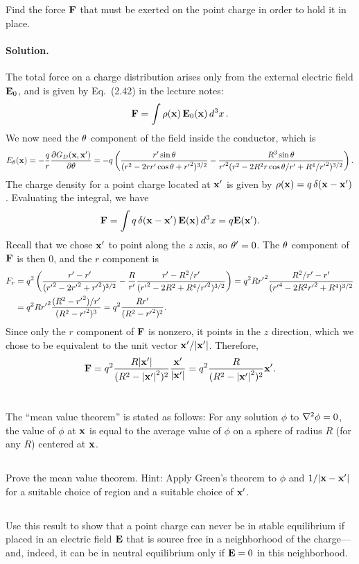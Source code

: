 \documentclass[11pt]{article}
\newcommand{\beq}{\begin{equation*}}
\newcommand{\eeq}{\end{equation*}}
\newenvironment{statement}[1]
{
	\section{#1}
	\color{darkgray}
	\ignorespaces
}
{
}
\newenvironment{problem}
{
	\subsection{}
	\color{darkgray}
    \ignorespaces
}
{

}
\newenvironment{solution}
{
    \paragraph{Solution.}
    \ignorespaces
}
{
    \bigskip
}
\begin{document}
\begin{problem}
	Find the force $\mathbf{F}$ that must be exerted on the point charge in order to hold it in place.
\end{problem}

\begin{solution}
	The total force on a charge distribution arises only from the external electric field $\mathbf{E}_0$, and is given by Eq.~(2.42) in the lecture notes:
	\beq
		\vF = \int \rhox \, \vEo(\vx) \dcx.
	\eeq
	We now need the $\theta$ component of the field inside the conductor, which is
	\beq
		\Etht(\vx) = -\frac{q}{r} \pdv{\Gdxxp}{\tht}
		= -q \left( \frac{r' \sint}{(r^2 - 2 r r' \cost + {r'}^2)^{3/2}} - \frac{R^3 \sint}{{r'}^2 (r^2 - 2 R^2 r \cost / r' + R^4 / {r'}^2)^{3/2}} \right).
	\eeq
	The charge density for a point charge located at $\mathbf{x}'$ is given by $\rho(\mathbf{x}) = q \, \delta(\mathbf{x} - \mathbf{x}')$.  Evaluating the integral, we have
	\beq
		\vF = \int q \, \delta(\vx - \vx') \, \vE(\vx) \dcx = q \vE(\vx').
	\eeq
	Recall that we chose $\mathbf{x}'$ to point along the $z$ axis, so $\theta' = 0$.  The $\theta$ component of $\mathbf{F}$ is then $0$, and the $r$ component is
	\begin{align*}
		F_r &= q^2 \left( \frac{r' - r'}{({r'}^2 - 2 {r'}^2 + {r'}^2)^{3/2}} - \frac{R}{r'} \frac{r' - R^2 / r'}{({r'}^2 - 2 R^2 + R^4 / {r'}^2)^{3/2}} \right)
		= q^2 R {r'}^2 \frac{R^2 / r' - r'}{({r'}^4 - 2 R^2 {r'}^2 + R^4)^{3/2}} \\
		&= q^2 R {r'}^2 \frac{(R^2 - {r'}^2) / r'}{(R^2 - {r'}^2)^3}
		= q^2 \frac{R r'}{(R^2 - {r'}^2)^2}.
	\end{align*}
	Since only the $r$ component of $\mathbf{F}$ is nonzero, it points in the $z$ direction, which we chose to be equivalent to the unit vector $\mathbf{x}' / \abs{\mathbf{x}'}$.  Therefore,
	\beq
		\vF = q^2 \frac{R \absxp}{(R^2 - \absxp^2)^2} \frac{\vx'}{\absxp}
		= q^2 \frac{R}{(R^2 - \absxp^2)^2} \vx'.
	\eeq
\end{solution}




\begin{statement}{}
	The ``mean value theorem'' is stated as follows: For any solution $\phi$ to $\nabla^2 \phi = 0$, the value of $\phi$ at $\mathbf{x}$ is equal to the average value of $\phi$ on a sphere of radius $R$ (for any $R$) centered at $\mathbf{x}$.
\end{statement}

\begin{problem}
	Prove the mean value theorem.  Hint: Apply Green's theorem to $\phi$ and $1/\abs{\mathbf{x} - \mathbf{x}'}$ for a suitable choice of region and a suitable choice of $\mathbf{x}'$.
\end{problem}

\begin{problem}
	Use this result to show that a point charge can never be in stable equilibrium if placed in an electric field $\mathbf{E}$ that is source free in a neighborhood of the charge---and, indeed, it can be in neutral equilibrium only if $\mathbf{E} = 0$ in this neighborhood.
\end{problem}

\end{document}
